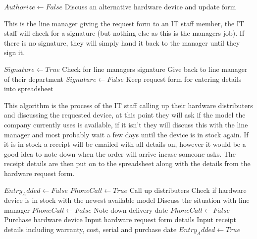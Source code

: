 \begin{algorithm}[H]
\begin{algorithmic}
\State$Authorize \leftarrow False$
		\State Discuss an alternative hardware device and update form
	\Else
	\EndIf
\EndWhile
\end{algorithmic}
\end{algorithm}

This is the line manager giving the request form to an IT staff member, the IT staff will check for a signature (but nothing else as this is the managers job). If there is no signature, they will simply hand it back to the manager until they sign it.

\begin{algorithm}[H]
\begin{algorithmic}
\State $Signature  \leftarrow True$
	\State Check for line managers signature
		\State Give back to line manager of their department
		\State $Signature  \leftarrow False$
	\Else
		\State Keep request form for entering details into spreadsheet
\EndIf
\EndWhile
\end{algorithmic}
\end{algorithm}

This algorithm is the process of the IT staff calling up their hardware distributers and discussing the requested device, at this point they will ask if the model the company currently uses is available, if it isn't they will discuss this with the line manager and most probably wait a few days until the device is in stock again. If it is in stock a receipt will be emailed with all details on, however it would be a good idea to note down when the order will arrive incase someone asks. The receipt details are then put on to the spreadsheet along with the details from the hardware request form.

\begin{algorithm}[H]
\begin{algorithmic}
\State $Entry_Added \leftarrow False$
\State $PhoneCall \leftarrow True$
		\State Call up distributers
		\State Check if hardware device is in stock with the newest available model
			\State Discuss the situation with line manager
			\State  $PhoneCall \leftarrow False$
		\Else
			\State Note down delivery date
			\State  $PhoneCall \leftarrow False$
		\EndIf
	\EndWhile
	\State Purchase hardware device
	\State Input hardware request form details
	\State Input receipt details including warranty, cost, serial and purchase date
	\State $Entry_Added \leftarrow True$
\EndWhile
\end{algorithmic}
\end{algorithm}


